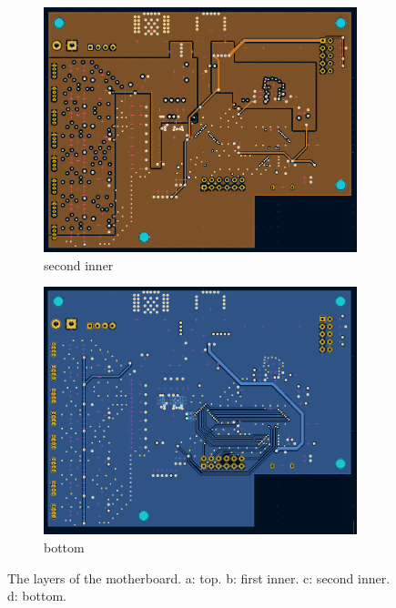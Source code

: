 \documentclass[notitlepage]{report}
\begin{document}
\begin{figure}[H]
\begin{subfigure}{0.5\textwidth}
	\includegraphics[width=.9\textwidth]{./pcb/mother/second_inner.png}
	\centering
	\caption{second inner}
	\label{fig:design_pcb_mother_second}
	\centering
\end{subfigure}
\begin{subfigure}{0.5\textwidth}
	\includegraphics[width=.9\textwidth]{./pcb/mother/bottom.png}
	\centering
	\caption{bottom}
	\label{fig:design_pcb_mother_bottom}
	\centering
\end{subfigure}
\caption{The layers of the motherboard. a: top. b: first inner. c: second inner. d: bottom.}
\label{fig:design_pcb_mother}
\centering
\end{figure}
\end{document}
